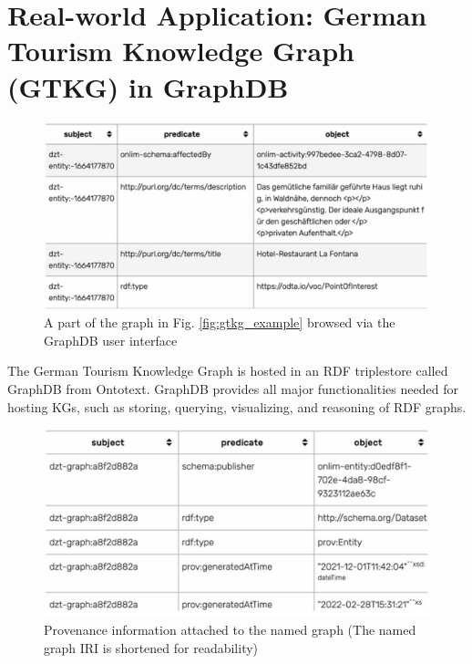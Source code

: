 \documentclass[12pt]{article}
\begin{document}
\section{Real-world Application: German Tourism Knowledge Graph (GTKG) in GraphDB}
\begin{figure}
    \includegraphics[width=\linewidth]{imgs/GraphDB user interface.jpeg}
    \caption{A part of the graph in Fig. \ref{fig:gtkg_example} browsed via the GraphDB user interface}
    \label{fig:graphdb-ui}
\end{figure}
The German Tourism Knowledge Graph is hosted in an RDF triplestore called GraphDB from Ontotext. GraphDB provides all major functionalities needed for hosting KGs, such as storing, querying, visualizing, and reasoning of RDF graphs.
\begin{figure}
    \includegraphics[width=\linewidth]{imgs/named graph.jpeg}
    \caption{Provenance information attached to the named graph (The named graph IRI is shortened
        for readability)}
    \label{fig:named-graph}
\end{figure}
\end{document}
